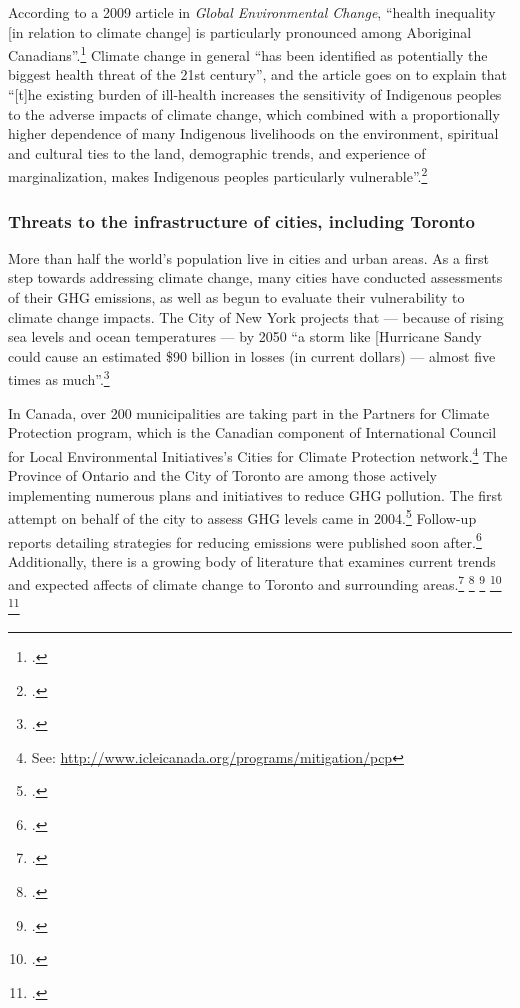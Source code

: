 According to a 2009 article in \emph{Global Environmental Change}, ``health inequality [in relation to climate change] is
particularly pronounced among Aboriginal Canadians''.\footcite[][p. 1]{VulAborig2009}
Climate change in general ``has been identified as potentially the biggest health threat of the 21st century'', and the article goes on to explain that ``[t]he existing burden of ill-health increases the sensitivity of Indigenous peoples to the adverse impacts of climate change, which combined with a proportionally higher dependence of many Indigenous livelihoods on the environment, spiritual and cultural ties to the land, demographic trends, and experience of marginalization, makes Indigenous peoples particularly vulnerable''.\footcite[][p. 1]{VulAborig2009}



	\subsubsection{Threats to the infrastructure of cities, including Toronto}



More than half the world's population live in cities and urban areas. 
As a first step towards addressing climate change, many cities have conducted assessments of their GHG emissions, as well as begun to evaluate their vulnerability to climate change impacts.
The City of New York projects that --- because of rising sea levels and ocean temperatures --- by 2050 ``a storm like [Hurricane Sandy could cause an estimated \$90 billion in losses (in current dollars) --- almost five times as much''.\footcite[][Foreward, p. 2]{ResilientNewYork}



In Canada, over 200 municipalities are taking part in the Partners for Climate Protection  program, which is the Canadian component of International Council for Local Environmental Initiatives's Cities for Climate Protection network.\footnote{See: \url{http://www.icleicanada.org/programs/mitigation/pcp}}
The Province of Ontario and the City of Toronto are among those actively implementing numerous plans and initiatives to reduce GHG pollution. 
The first attempt on behalf of the city to assess GHG levels came in 2004.\footcite[][p. IV]{GHGPollutionToronto}
Follow-up reports detailing strategies for reducing emissions were published soon after.\footcite[][]{CCAHealthEquity}
Additionally, there is a growing body of literature that examines current trends and expected affects of climate change to Toronto and surrounding areas.\footcite[][]{TorontoEnvOff2007} \footcite[][]{TorontoAheadStorm} \footcite[][]{ScanCCToronto} \footcite[][]{AdaptPrioritiesCanada} \footcite[][]{MacLeodAdaptation}



